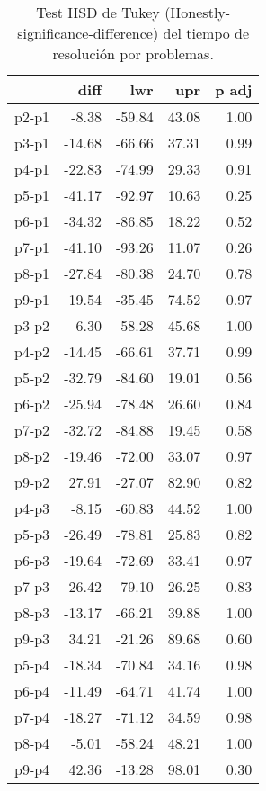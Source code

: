\begin{table}[H]
\centering
\caption{Test HSD de Tukey (Honestly-significance-difference) del tiempo de resolución por problemas.}
\label{tab:Tukeyduration}
\begin{tabular}{rrrrr}
  \hline
 & diff & lwr & upr & p adj \\ 
  \hline
p2-p1 & -8.38 & -59.84 & 43.08 & 1.00 \\ 
  p3-p1 & -14.68 & -66.66 & 37.31 & 0.99 \\ 
  p4-p1 & -22.83 & -74.99 & 29.33 & 0.91 \\ 
  p5-p1 & -41.17 & -92.97 & 10.63 & 0.25 \\ 
  p6-p1 & -34.32 & -86.85 & 18.22 & 0.52 \\ 
  p7-p1 & -41.10 & -93.26 & 11.07 & 0.26 \\ 
  p8-p1 & -27.84 & -80.38 & 24.70 & 0.78 \\ 
  p9-p1 & 19.54 & -35.45 & 74.52 & 0.97 \\ 
  p3-p2 & -6.30 & -58.28 & 45.68 & 1.00 \\ 
  p4-p2 & -14.45 & -66.61 & 37.71 & 0.99 \\ 
  p5-p2 & -32.79 & -84.60 & 19.01 & 0.56 \\ 
  p6-p2 & -25.94 & -78.48 & 26.60 & 0.84 \\ 
  p7-p2 & -32.72 & -84.88 & 19.45 & 0.58 \\ 
  p8-p2 & -19.46 & -72.00 & 33.07 & 0.97 \\ 
  p9-p2 & 27.91 & -27.07 & 82.90 & 0.82 \\ 
  p4-p3 & -8.15 & -60.83 & 44.52 & 1.00 \\ 
  p5-p3 & -26.49 & -78.81 & 25.83 & 0.82 \\ 
  p6-p3 & -19.64 & -72.69 & 33.41 & 0.97 \\ 
  p7-p3 & -26.42 & -79.10 & 26.25 & 0.83 \\ 
  p8-p3 & -13.17 & -66.21 & 39.88 & 1.00 \\ 
  p9-p3 & 34.21 & -21.26 & 89.68 & 0.60 \\ 
  p5-p4 & -18.34 & -70.84 & 34.16 & 0.98 \\ 
  p6-p4 & -11.49 & -64.71 & 41.74 & 1.00 \\ 
  p7-p4 & -18.27 & -71.12 & 34.59 & 0.98 \\ 
  p8-p4 & -5.01 & -58.24 & 48.21 & 1.00 \\ 
  p9-p4 & 42.36 & -13.28 & 98.01 & 0.30 \\ 

\end{tabular}
\end{table}
